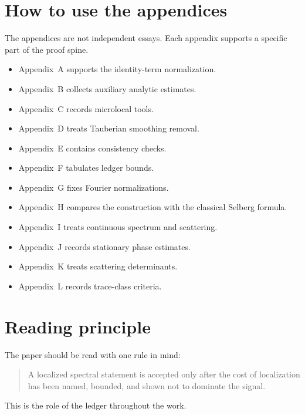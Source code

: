 \section*{How to use the appendices}

The appendices are not independent essays.  Each appendix supports a specific part of the proof spine.

\begin{itemize}
  \item Appendix~A supports the identity-term normalization.
  \item Appendix~B collects auxiliary analytic estimates.
  \item Appendix~C records microlocal tools.
  \item Appendix~D treats Tauberian smoothing removal.
  \item Appendix~E contains consistency checks.
  \item Appendix~F tabulates ledger bounds.
  \item Appendix~G fixes Fourier normalizations.
  \item Appendix~H compares the construction with the classical Selberg formula.
  \item Appendix~I treats continuous spectrum and scattering.
  \item Appendix~J records stationary phase estimates.
  \item Appendix~K treats scattering determinants.
  \item Appendix~L records trace-class criteria.
\end{itemize}

\section*{Reading principle}

The paper should be read with one rule in mind:

\begin{quote}
A localized spectral statement is accepted only after the cost of localization has been named, bounded, and shown not to dominate the signal.
\end{quote}

This is the role of the ledger throughout the work.
